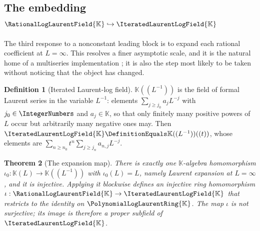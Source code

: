 \documentclass[11pt,oneside]{article}
\theoremstyle{plain}
\newtheorem{theorem}{Theorem}[section]
\theoremstyle{definition}
\newtheorem{definition}[theorem]{Definition}
\theoremstyle{remark}
\newcommand{\K}{\mathbb{K}}
\newcommand{\PLlau}{\PolynomialLogLaurentRing{\K}}       %
\newcommand{\PLrat}{\RationalLogLaurentField{\K}}        %
\newcommand{\PLit}{\IteratedLaurentLogField{\K}}         %
\begin{document}
\subsection{The embedding \texorpdfstring{\(\PLrat\hookrightarrow\PLit\)}%
{K(L)((t)) into K((1/L))((t))}}
\label{plt:sec:div-embedding}

The third response to a nonconstant leading block is to expand each rational
coefficient at \(L=\infty\).  This resolves a finer asymptotic scale, and it is
the natural home of a multiseries implementation \cite{salvy-shackell-1998};
it is also the step most likely to be taken without noticing that the object
has changed.

\begin{definition}[Iterated Laurent-log field]\label{plt:def:div-iterated}
\(\K((L^{-1}))\) is the field of formal Laurent series in the variable
\(L^{-1}\): elements \(\sum_{j\ge j_{0}}a_{j}L^{-j}\) with
\(j_{0}\in\IntegerNumbers\) and \(a_{j}\in\K\), so that only finitely many
positive powers of \(L\) occur but arbitrarily many negative ones may.  Then
\(\PLit\DefinitionEquals\K((L^{-1}))((t))\), whose elements are
\(\sum_{n\ge n_{0}}t^{n}\sum_{j\ge j_{n}}a_{n,j}L^{-j}\).
\end{definition}

\begin{theorem}[The expansion map]\label{plt:thm:div-embedding}
There is exactly one \(\K\)-algebra homomorphism
\(\iota_{0}:\K(L)\to\K((L^{-1}))\) with \(\iota_{0}(L)=L\), namely Laurent
expansion at \(L=\infty\), and it is injective.  Applying it blockwise defines
an injective ring homomorphism \(\iota:\PLrat\to\PLit\) that restricts to the
identity on \(\PLlau\).  The map \(\iota\) is \emph{not} surjective; its image
is therefore a proper subfield of \(\PLit\).
\end{theorem}
\end{document}
